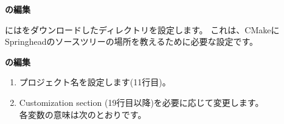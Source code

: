 \bigskip
\noindent
\bf{\CMakeTopdir{}}の編集
\begin{narrow}[20pt]
	\CMakeTopdir{}には\SprLib をダウンロードしたディレクトリを設定します。
	これは、CMakeにSpringheadのソースツリーの場所を教えるために必要な設定です。

	\begin{narrow}[15pt]
	\end{narrow}
\end{narrow}
\medskip
\bf{\CMakeLists{}}の編集
\begin{narrow}[20pt]
	\begin{enumerate}
	    \item
		プロジェクト名を設定します(11行目)。

		\begin{narrow}[s][5pt]
		\end{narrow}

	    \item
		Customization section (19行目以降)を必要に応じて変更します。\\
		各変数の意味は次のとおりです。


\end{enumerate}
\end{narrow}
